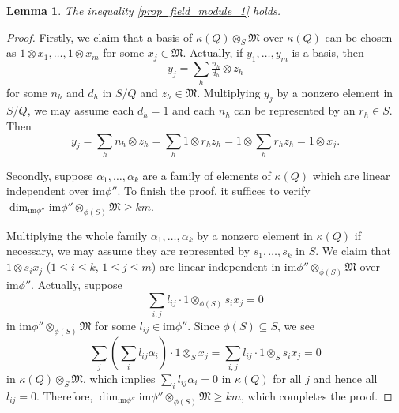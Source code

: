\documentclass[12pt]{amsart}
\theoremstyle{plain}
\newtheorem{lemma}[theorem]{Lemma}
\theoremstyle{definition}
\theoremstyle{question}
\theoremstyle{remark}
\theoremstyle{assumption}
\numberwithin{equation}{section}
\theoremstyle{bigthm}
\begin{document}
\begin{lemma}\label{lem_dimension_inequality}
The inequality \eqref{prop_field_module_1} holds.
\end{lemma}
\begin{proof}
Firstly, we claim that a basis of $\kappa (Q) \otimes_{S} \mathfrak{M}$ over $\kappa (Q)$ can be chosen as $1 \otimes x_{1}, \dots, 1 \otimes x_{m}$ for some $x_{j} \in \mathfrak{M}$. Actually, if $y_{1}, \dots, y_{m}$ is a basis, then
\[
y_{j} = \sum_{h} \tfrac{n_{h}}{d_{h}} \otimes z_{h}
\]
for some $n_{h}$ and $d_{h}$ in $S/Q$ and $z_{h} \in \mathfrak{M}$. Multiplying $y_{j}$ by a nonzero element in $S/Q$, we may assume each $d_{h} =1$ and each $n_{h}$ can be represented by an $r_{h} \in S$. Then
\[
y_{j} = \sum_{h} n_{h} \otimes z_{h} = \sum_{h} 1 \otimes r_{h} z_{h} = 1 \otimes \sum_{h} r_{h} z_{h} = 1 \otimes x_{j}.
\]

Secondly, suppose $\alpha_{1}, \dots, \alpha_{k}$ are a family of elements of $\kappa (Q)$ which are linear independent over $\mathrm{im} \phi''$. To finish the proof, it suffices to verify $\dim_{\mathrm{im} \phi''} \mathrm{im} \phi'' \otimes_{\phi (S)} \mathfrak{M} \ge km$.

Multiplying the whole family $\alpha_{1}, \dots, \alpha_{k}$ by a nonzero element in $\kappa (Q)$ if necessary, we may assume they are represented by $s_{1}, \dots, s_{k}$ in $S$. We claim that $1 \otimes s_{i} x_{j}$ ($1 \leq i \leq k$, $1 \leq j \leq m$) are linear independent in $\mathrm{im} \phi'' \otimes_{\phi (S)} \mathfrak{M}$ over $\mathrm{im} \phi''$. Actually, suppose
\[
\sum_{i,j} l_{ij} \cdot 1 \otimes_{\phi (S)} s_{i} x_{j} =0
\]
in $\mathrm{im} \phi'' \otimes_{\phi (S)} \mathfrak{M}$ for some $l_{ij} \in \mathrm{im} \phi''$. Since $\phi (S) \subseteq S$, we see
\[
\sum_{j} \left( \sum_{i} l_{ij} \alpha_{i} \right) \cdot 1 \otimes_{S} x_{j} = \sum_{i,j} l_{ij} \cdot 1 \otimes_{S} s_{i} x_{j} = 0
\]
in $\kappa (Q) \otimes_{S} \mathfrak{M}$, which implies $\sum_{i} l_{ij} \alpha_{i} =0$ in $\kappa (Q)$ for all $j$ and hence all $l_{ij} =0$. Therefore, $\dim_{\mathrm{im} \phi''} \mathrm{im} \phi'' \otimes_{\phi (S)} \mathfrak{M} \ge km$, which completes the proof.
\end{proof}
\end{document}
